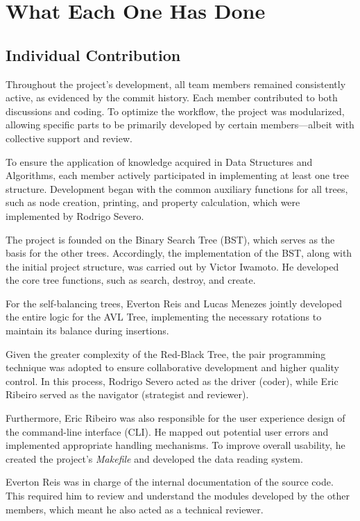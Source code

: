 \section{What Each One Has Done}

\subsection{Individual Contribution}

Throughout the project's development, all team members remained consistently active, as evidenced by the commit history. Each member contributed to both discussions and coding. To optimize the workflow, the project was modularized, allowing specific parts to be primarily developed by certain members—albeit with collective support and review.

To ensure the application of knowledge acquired in Data Structures and Algorithms, each member actively participated in implementing at least one tree structure. Development began with the common auxiliary functions for all trees, such as node creation, printing, and property calculation, which were implemented by Rodrigo Severo.

The project is founded on the Binary Search Tree (BST), which serves as the basis for the other trees. Accordingly, the implementation of the BST, along with the initial project structure, was carried out by Victor Iwamoto. He developed the core tree functions, such as search, destroy, and create.

For the self-balancing trees, Everton Reis and Lucas Menezes jointly developed the entire logic for the AVL Tree, implementing the necessary rotations to maintain its balance during insertions.

Given the greater complexity of the Red-Black Tree, the pair programming technique was adopted to ensure collaborative development and higher quality control. In this process, Rodrigo Severo acted as the driver (coder), while Eric Ribeiro served as the navigator (strategist and reviewer).

Furthermore, Eric Ribeiro was also responsible for the user experience design of the command-line interface (CLI). He mapped out potential user errors and implemented appropriate handling mechanisms. To improve overall usability, he created the project's \textit{Makefile} and developed the data reading system.

Everton Reis was in charge of the internal documentation of the source code. This required him to review and understand the modules developed by the other members, which meant he also acted as a technical reviewer.

